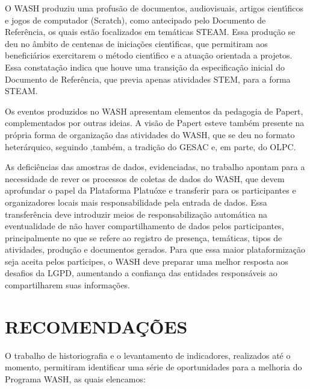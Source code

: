 \documentclass[
12pt,		%
openright,	%
twoside,  %
a4paper,			%
chapter=TITLE,		%
english,			%
french,				%
spanish,			%
brazil				%
]{USPSC-classe/USPSC}
\begin{document}
\begin{alineas}
\item O WASH produziu uma profus\~ao de documentos, audiovisuais, artigos cient\'{\i}ficos e jogos de computador (Scratch), como antecipado pelo Documento de Refer\^encia, os quais est\~ao focalizados em tem\'aticas STEAM. Essa produ\c{c}\~ao se deu no \^ambito de centenas de inicia\c{c}\~oes cient\'{\i}ficas, que permitiram aos benefici\'arios exercitarem o m\'etodo cient\'{\i}fico e a atua\c{c}\~ao orientada a projetos. Essa constata\c{c}\~ao indica que houve uma transi\c{c}\~ao da especifica\c{c}\~ao inicial do Documento de Refer\^encia, que previa apenas atividades STEM, para a forma STEAM.
\item Os eventos produzidos no WASH apresentam elementos da pedagogia de Papert, complementados por outras ideias. A vis\~ao de Papert esteve tamb\'em presente na pr\'opria forma de organiza\c{c}\~ao das atividades do WASH, que se deu no formato heter\'arquico, seguindo ,tamb\'em, a tradi\c{c}\~ao do GESAC e, em parte, do OLPC.
\item As defici\^encias das amostras de dados, evidenciadas, no trabalho apontam para a necessidade de rever os processos de coletas de dados do WASH, que devem aprofundar o papel da Plataforma Platu\'oxe e transferir para os participantes e organizadores locais mais responsabilidade pela entrada de dados. Essa transfer\^encia deve introduzir meios de responsabiliza\c{c}\~ao autom\'atica na eventualidade de n\~ao haver compartilhamento de dados pelos participantes, principalmente no que se refere ao registro de presen\c{c}a, tem\'aticas, tipos de atividades, produ\c{c}\~ao e documentos gerados. Para que essa maior plataformiza\c{c}\~ao seja aceita pelos part\'{\i}cipes, o WASH deve preparar uma melhor resposta aos desafios da LGPD, aumentando a confian\c{c}a das entidades respons\'aveis ao compartilharem suas informa\c{c}\~oes.
\end{alineas}

\chapter[RECOMENDA\c{C}\~OES]{RECOMENDA\c{C}\~OES}\label{RECOMENDA\c{C}\~OES}
O trabalho de historiografia e o levantamento de indicadores, realizados at\'e o momento, permitiram identificar uma s\'erie de oportunidades para a melhoria do Programa WASH, as quais elencamos:
\end{document}
